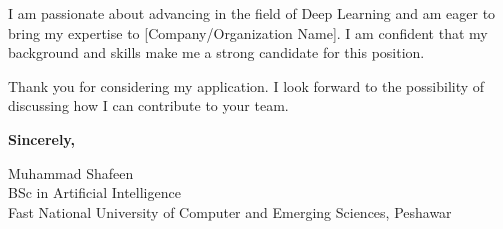 \documentclass{letter}
\begin{document}
I am passionate about advancing in the field of Deep Learning and am eager to bring my expertise to [Company/Organization Name]. I am confident that my background and skills make me a strong candidate for this position.

Thank you for considering my application. I look forward to the possibility of discussing how I can contribute to your team.

\vspace{2em}

\textbf{Sincerely,}

\vspace{1em}

Muhammad Shafeen \\
BSc in Artificial Intelligence \\
Fast National University of Computer and Emerging Sciences, Peshawar
\end{document}
